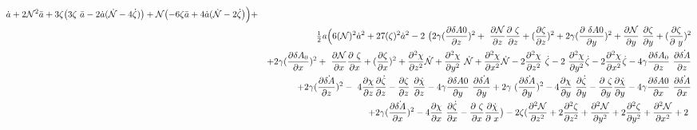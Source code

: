 \documentclass[%
 reprint,
 amsmath,amssymb,
 aps,
]{revtex4-1}
\begin{document}
\begin{widetext}
\begin{small}
\begin{eqnarray}
\dot{a} + 2\mathcal{N}^2 \ddot{a} + 3 \zeta \bigl(3 \zeta \
\ddot{a} - 2 \dot{a} (\dot{\mathcal{N}}- 4 \dot{\zeta})\bigr)+ \mathcal{N} \bigl(-6 \zeta \ddot{a}\nonumber + 4 \dot{a} (\dot{\mathcal{N}} - 2 \dot{\zeta}\bigr)\Bigr) +\\
&& \tfrac{1}{2} \mathit{a} \Bigl(6 (\mathcal{N})^2 \dot{a}^2 \nonumber  + 27 (\zeta)^2 \dot{a}^2 - 2 \
\bigl(2 \gamma (\frac{\partial \delta A0}{\partial z})^2 + \
\frac{\partial \mathcal{N}}{\partial z} \frac{\partial \
\zeta}{\partial z} \nonumber + (\frac{\partial \zeta}{\partial z})^2 + 2 \gamma (\frac{\partial \
\delta A0}{\partial y})^2 + \frac{\partial \mathcal{N}}{\partial y} \
\frac{\partial \zeta}{\partial y} + (\frac{\partial \zeta}{\partial \
y})^2 \nonumber\\
&& + 2 \gamma (\frac{\partial \delta A_0}{\partial x})^2 + \
\frac{\partial \mathcal{N}}{\partial x} \frac{\partial \
\zeta}{\partial x}+ (\frac{\partial \zeta}{\partial x})^2 \nonumber + \frac{\partial^{2}\chi}{\partial z^{2}} \dot{\mathcal{N}} + \frac{\partial^{2}\chi}{\partial y^{2}} \
\dot{\mathcal{N}}\nonumber + \frac{\partial^{2}\chi}{\partial x^{2}} \dot{\mathcal{N}} - 2 \frac{\partial^{2}\chi}{\partial z^{2}} \
\dot{\zeta} - 2 \
\frac{\partial^{2}\chi}{\partial y^{2}} \dot{\zeta}\nonumber- 2 \frac{\partial^{2}\chi}{\partial x^{2}}\dot{\zeta} - 4 \gamma \frac{\partial \delta A_0}{\partial z} \
\frac{\partial\dot{\delta A}}{\partial z} \nonumber \\
&& + 2 \gamma (\frac{\partial\dot{\delta A}}{\partial z})^2 - \
4 \frac{\partial \chi}{\partial z} \frac{\partial\dot{\zeta}}{\partial z} -  \frac{\partial \zeta}{\partial z} \
\frac{\partial\dot{\chi}}{\partial z} \nonumber - 4 \gamma \frac{\partial \delta A0}{\partial y} \
\frac{\partial\dot{\delta A}}{\partial y} + 2 \gamma \
(\frac{\partial\dot{\delta A}}{\partial y})^2 \nonumber - 4 \frac{\partial \chi}{\partial y} \
\frac{\partial\dot{\zeta}}{\partial y} -  \frac{\partial \
\zeta}{\partial y} \frac{\partial\dot{\chi}}{\partial y} \nonumber - 4 \gamma \frac{\partial \delta A0}{\partial x} \
\frac{\partial\dot{\delta A}}{\partial x}\\
&& + 2 \gamma (\frac{\partial\dot{\delta A}}{\partial x})^2 \nonumber - 4 \frac{\partial \chi}{\partial x} \
\frac{\partial\dot{\zeta}}{\partial x} -  \frac{\partial \
\zeta}{\partial x} \frac{\partial\dot{\chi}}{\partial \
x}\bigr) \nonumber - 2 \zeta (\frac{\partial^{2}\mathcal{N}}{\partial z^{2}} + 2 \frac{\partial^{2}\zeta}{\partial z^{2}} + \frac{\partial^{2}\mathcal{N}}{\partial y^{2}} + 2 \frac{\partial^{2}\zeta}{\partial y^{2}} \nonumber + \frac{\partial^{2}\mathcal{N}}{\partial x^{2}} + 2 \

\end{eqnarray}
\end{small}
\end{widetext}
\end{document}
